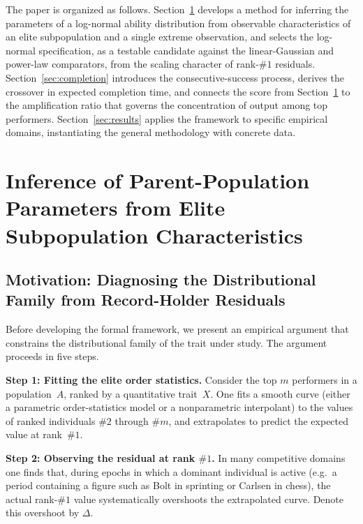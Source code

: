 \documentclass{article}
\begin{document}
The paper is organized as follows.
Section~\ref{sec:inference} develops a method for inferring the
parameters of a log-normal ability distribution from observable
characteristics of an elite subpopulation and a single extreme
observation, and selects the log-normal specification, as a testable candidate against the linear-Gaussian and power-law comparators, from the scaling character of rank-$\#1$ residuals.
Section~\ref{sec:completion} introduces the consecutive-success process,
derives the crossover in expected completion time, and connects
the score from Section~\ref{sec:inference} to the amplification ratio
that governs the concentration of output among top performers.
Section~\ref{sec:results} applies the framework to specific empirical
domains, instantiating the general methodology with concrete data.


\section{Inference of Parent-Population Parameters from Elite Subpopulation
         Characteristics}\label{sec:inference}

\subsection{Motivation: Diagnosing the Distributional Family from
            Record-Holder Residuals}\label{ssec:motivation}

Before developing the formal framework, we present an empirical argument
that constrains the distributional family of the trait under study. The
argument proceeds in five steps.

\medskip
\noindent\textbf{Step 1: Fitting the elite order statistics.}\;
Consider the top $m$ performers in a population~$A$, ranked by a
quantitative trait~$X$. One fits a smooth curve (either a parametric
order-statistics model or a nonparametric interpolant) to the values of
ranked individuals $\#2$ through $\#m$, and extrapolates to predict the
expected value at rank~$\#1$.

\medskip
\noindent\textbf{Step 2: Observing the residual at rank $\#1$.}\;
In many competitive domains one finds that, during epochs in which a
dominant individual is active (e.g.\ a period containing a figure such as
Bolt in sprinting or Carlsen in chess), the actual rank-$\#1$ value
systematically overshoots the extrapolated curve. Denote this overshoot
by $\Delta$.
\end{document}
